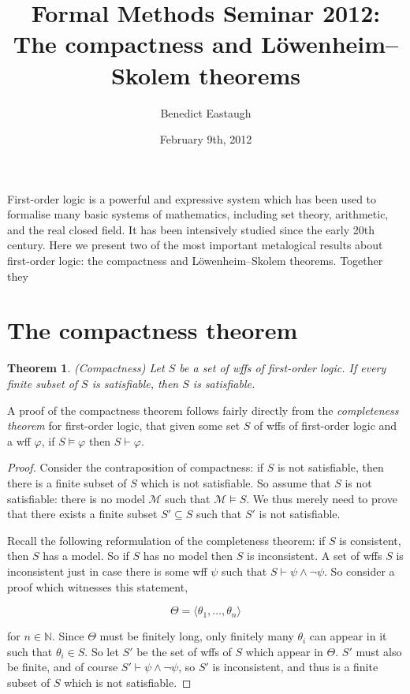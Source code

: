 \documentclass[10pt, a4paper, oneside]{article}
\title{Formal Methods Seminar 2012:\\
       The compactness and Löwenheim--Skolem theorems}
\author{Benedict Eastaugh}
\date{February 9th, 2012}
\newtheorem{thm}{Theorem}[section]
\theoremstyle{definition}
\theoremstyle{remark}
\theoremstyle{plain}
\begin{document}
\maketitle

First-order logic is a powerful and expressive system which has been used to
formalise many basic systems of mathematics, including set theory, arithmetic,
and the real closed field. It has been intensively studied since the early 20th
century. Here we present two of the most important metalogical results about
first-order logic: the compactness and Löwenheim--Skolem theorems. Together
they


\section{The compactness theorem}

\begin{thm}
    (Compactness) Let $S$ be a set of wffs of first-order logic. If every finite
    subset of $S$ is satisfiable, then $S$ is satisfiable.
\end{thm}

A proof of the compactness theorem follows fairly directly from the
\emph{completeness theorem} for first-order logic, that given some set $S$ of
wffs of first-order logic and a wff $\varphi$, if $S \models \varphi$ then
$S \vdash \varphi$.

\begin{proof}
    Consider the contraposition of compactness: if $S$ is not satisfiable, then
    there is a finite subset of $S$ which is not satisfiable. So assume that $S$
    is not satisfiable: there is no model $\mathcal{M}$ such that $\mathcal{M}
    \models S$. We thus merely need to prove that there exists a finite subset
    $S' \subseteq S$ such that $S'$ is not satisfiable.
    
    Recall the following reformulation of the completeness theorem: if $S$ is
    consistent, then $S$ has a model. So if $S$ has no model then $S$ is
    inconsistent. A set of wffs $S$ is inconsistent just in case there is some
    wff $\psi$ such that $S \vdash \psi \wedge \neg\psi$. So consider a proof
    which witnesses this statement,
    
    \begin{displaymath}
        \Theta = \langle \theta_1, \dotsc, \theta_n \rangle
    \end{displaymath}
    
    for $n \in \mathbb{N}$. Since $\Theta$ must be finitely long, only finitely
    many $\theta_i$ can appear in it such that $\theta_i \in S$. So let $S'$ be
    the set of wffs of $S$ which appear in $\Theta$. $S'$ must also be finite,
    and of course $S' \vdash \psi \wedge \neg\psi$, so $S'$ is inconsistent, and
    thus is a finite subset of $S$ which is not satisfiable.
\end{proof}
\end{document}
